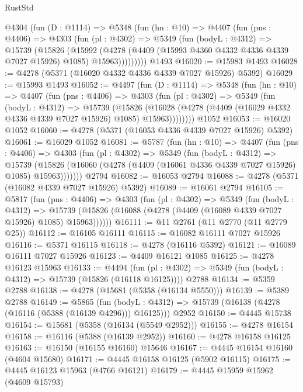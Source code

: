 \begin{lexlean}{RustStd}
\begin{coremodule}
{\begin{coremodule}
{{{{{{{{{{{{{{{{{{{{{{{{{{{{{{{{{{{    @4304
      (fun (D : @1114) =>
      @5348
        (fun (hn : @10) =>
        @4407
          (fun (pns : @4406) =>
          @4303
            (fun (pl : @4302) =>
            @5349
              (fun (bodyL : @4312) =>
              @15739
                (@15826
                  (@15992
                    (@4278
                      (@4409 (@15993 @4360 @4332 @4336 @4339 @7027 @15926) @1085)
                      @15963)))))))))
    @1493
@16020 := @15983 @1493
@16028 := @4278 (@5371 (@16020 @4332 @4336 @4339 @7027 @15926) @5392)
@16029 := @15993 @1493
@16052 := @4497
    (fun (D : @1114) =>
    @5348
      (fun (hn : @10) =>
      @4407
        (fun (pns : @4406) =>
        @4303
          (fun (pl : @4302) =>
          @5349
            (fun (bodyL : @4312) =>
            @15739
              (@15826
                (@16028 (@4278 (@4409 (@16029 @4332 @4336 @4339 @7027 @15926) @1085) @15963))))))))
    @1052
@16053 := @16020 @1052
@16060 := @4278 (@5371 (@16053 @4336 @4339 @7027 @15926) @5392)
@16061 := @16029 @1052
@16081 := @5787
    (fun (hn : @10) =>
    @4407
      (fun (pns : @4406) =>
      @4303
        (fun (pl : @4302) =>
        @5349
          (fun (bodyL : @4312) =>
          @15739
            (@15826 (@16060 (@4278 (@4409 (@16061 @4336 @4339 @7027 @15926) @1085) @15963)))))))
    @2794
@16082 := @16053 @2794
@16088 := @4278 (@5371 (@16082 @4339 @7027 @15926) @5392)
@16089 := @16061 @2794
@16105 := @5817
    (fun (pns : @4406) =>
    @4303
      (fun (pl : @4302) =>
      @5349
        (fun (bodyL : @4312) =>
        @15739 (@15826 (@16088 (@4278 (@4409 (@16089 @4339 @7027 @15926) @1085) @15963))))))
@16111 := @11 @2761 (@11 @2770 (@11 @2779 @25))
@16112 := @16105 @16111
@16115 := @16082 @16111 @7027 @15926
@16116 := @5371 @16115
@16118 := @4278 (@16116 @5392)
@16121 := @16089 @16111 @7027 @15926
@16123 := @4409 @16121 @1085
@16125 := @4278 @16123 @15963
@16133 := @4494
    (fun (pl : @4302) => @5349 (fun (bodyL : @4312) => @15739 (@15826 (@16118 @16125))))
    @2788
@16134 := @5359 @2788
@16138 := @4278 (@15681 (@5358 (@16134 @5550)))
@16139 := @5389 @2788
@16149 := @5865
    (fun (bodyL : @4312) => @15739 (@16138 (@4278 (@16116 (@5388 (@16139 @4296))) @16125)))
    @2952
@16150 := @4445 @15738
@16154 := @15681 (@5358 (@16134 (@5549 @2952)))
@16155 := @4278 @16154
@16158 := @16116 (@5388 (@16139 @2952))
@16160 := @4278 @16158 @16125
@16163 := @16150 (@16155 @16160) @15646
@16167 := @4445 @16154 @16160 (@4604 @15680)
@16171 := @4445 @16158 @16125 (@5902 @16115)
@16175 := @4445 @16123 @15963 (@4766 @16121)
@16179 := @4445 @15959 @15962 (@4609 @15793)
}}}}}}}}}}}}}}}}}}}}}}}}}}}}}}}}}}}
\end{coremodule}}
\end{coremodule}
\end{lexlean}
